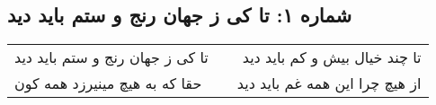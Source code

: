 \begin{center}
\section*{شماره ۱: تا کی ز جهان رنج و ستم باید دید}
\label{sec:001}
\begin{longtable}{l p{0.5cm} r}
تا کی ز جهان رنج و ستم باید دید
&&
تا چند خیال بیش و کم باید دید
\\
حقا که به هیچ مینیرزد همه کون
&&
از هیچ چرا این همه غم باید دید
\\
\end{longtable}
\end{center}
